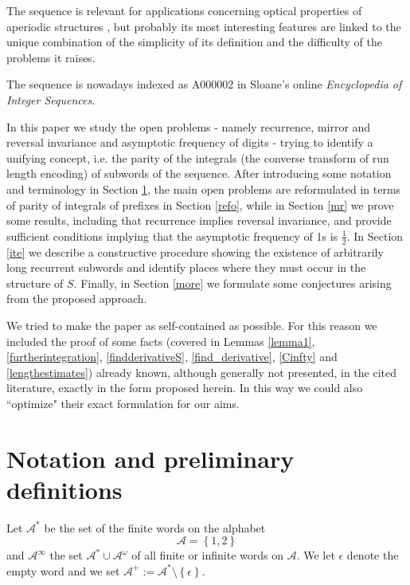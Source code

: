 \documentclass[10pt,a4paper]{article}
\begin{document}
The sequence is relevant for applications concerning optical properties of aperiodic structures \cite{tuz2013optical,fesenko2014terahertz,sing2004kolakoski}, but probably its most interesting features are linked to the unique combination of the simplicity of its definition and the difficulty of the problems it raises. 

The sequence is nowadays indexed as A000002 in Sloane's online \textit{Encyclopedia of Integer Sequences}.

In this paper we study the open problems - namely recurrence, mirror and reversal invariance and asymptotic frequency of digits - trying to identify a unifying concept, i.e. the parity of the integrals (the converse transform of run length encoding) of subwords of the sequence. After introducing some notation and terminology in Section \ref{not}, the main open problems are reformulated in terms of parity of integrals of prefixes in Section \ref{refo}, while in Section \ref{mr} we prove some results, including that recurrence implies reversal invariance, and provide sufficient conditions implying that the asymptotic frequency of 1s is $\frac{1}{2}$. In Section \ref{ite} we describe a constructive procedure showing the existence of arbitrarily long recurrent subwords and identify places where they must occur in the structure of $S$. Finally, in Section \ref{more} we formulate some conjectures arising from the proposed approach. 

We tried to make the paper as self-contained as possible. For this reason we included the proof of some facts (covered in Lemmas \ref{lemma1}, \ref{furtherintegration}, \ref{findderivativeS}, \ref{find_derivative}, \ref{Cinfty} and \ref{lengthestimates})  already known, although generally not presented, in the cited literature, exactly in the form proposed herein. In this way we could also ``optimize" their exact formulation for our aims.

\section{Notation and preliminary definitions}
\label{not}
Let $\mathcal{A}^*$ be the set of the finite words on the alphabet $$\mathcal{A}=\left\lbrace 1,2 \right\rbrace$$ and $\mathcal{A}^{\infty}$ the set $\mathcal{A}^*\cup \mathcal{A}^{\omega}$ of all finite or infinite words on $\mathcal{A}$. We let $\epsilon$ denote the empty word and we set $\mathcal{A}^+:=\mathcal{A}^*\setminus \left\lbrace\epsilon\right\rbrace$. 
\end{document}
